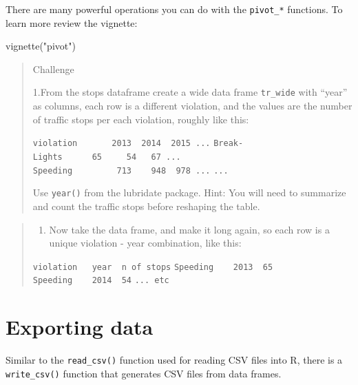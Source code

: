 \documentclass[
]{book}
\newenvironment{Shaded}{\begin{snugshade}}{\end{snugshade}}
\newcommand{\FunctionTok}[1]{\textcolor[rgb]{0.00,0.00,0.00}{#1}}
\newcommand{\NormalTok}[1]{#1}
\newcommand{\StringTok}[1]{\textcolor[rgb]{0.31,0.60,0.02}{#1}}
\providecommand{\tightlist}{%
  \setlength{\itemsep}{0pt}\setlength{\parskip}{0pt}}
\begin{document}
There are many powerful operations you can do with the \texttt{pivot\_*} functions. To learn more review the vignette:

\begin{Shaded}
\begin{Highlighting}[]
\FunctionTok{vignette}\NormalTok{(}\StringTok{"pivot"}\NormalTok{)}
\end{Highlighting}
\end{Shaded}

\begin{quote}
Challenge

1.From the stops dataframe create a wide data frame \texttt{tr\_wide} with
``year'' as columns, each row is a different violation,
and the values are the
number of traffic stops per each violation, roughly like this:

\texttt{violation\ \ \ \ \ \ \textbar{}\ 2013\ \textbar{}\ 2014\ \textbar{}\ 2015\ ...}
\texttt{Break-Lights\ \ \ \textbar{}\ \ \ 65\ \textbar{}\ \ \ \ 54\textbar{}\ \ \ 67\ ...}
\texttt{Speeding\ \ \ \ \ \ \ \textbar{}\ \ 713\ \textbar{}\ \ \ 948\textbar{}\ \ 978\ ...}
\texttt{...}

Use \texttt{year()} from the lubridate package. Hint: You will need to summarize
and count the traffic stops before reshaping the table.
\end{quote}

\begin{quote}
\begin{enumerate}
\def\labelenumi{\arabic{enumi}.}
\setcounter{enumi}{1}
\tightlist
\item
  Now take the data frame, and make it long again, so each row is a
  unique violation - year combination, like this:
\end{enumerate}

\texttt{violation\ \ \textbar{}\ year\ \textbar{}\ n\ of\ stops}
\texttt{Speeding\ \ \ \textbar{}\ 2013\ \textbar{}\ 65}
\texttt{Speeding\ \ \ \textbar{}\ 2014\ \textbar{}\ 54}
\texttt{...\ etc}
\end{quote}

\hypertarget{exporting-data}{%
\section{Exporting data}\label{exporting-data}}

Similar to the \texttt{read\_csv()} function used for reading CSV files into R, there is a \texttt{write\_csv()} function that generates CSV files from data frames.
\end{document}
